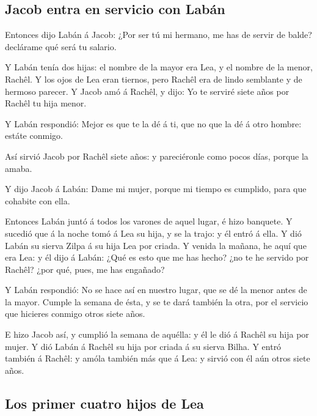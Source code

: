 \hypertarget{jacob-entra-en-servicio-con-labuxe1n}{%
\subsection{Jacob entra en servicio con
Labán}\label{jacob-entra-en-servicio-con-labuxe1n}}

 Entonces dijo Labán á Jacob: ¿Por ser tú mi hermano, me
has de servir de balde? declárame qué será tu salario.

 Y Labán tenía dos hijas: el nombre de la mayor era Lea, y
el nombre de la menor, Rachêl.  Y los ojos de Lea eran
tiernos, pero Rachêl era de lindo semblante y de hermoso parecer.
 Y Jacob amó á Rachêl, y dijo: Yo te serviré siete años por
Rachêl tu hija menor.

 Y Labán respondió: Mejor es que te la dé á ti, que no que
la dé á otro hombre: estáte conmigo.

 Así sirvió Jacob por Rachêl siete años: y pareciéronle
como pocos días, porque la amaba.

 Y dijo Jacob á Labán: Dame mi mujer, porque mi tiempo es
cumplido, para que cohabite con ella.

 Entonces Labán juntó á todos los varones de aquel lugar, é
hizo banquete.  Y sucedió que á la noche tomó á Lea su
hija, y se la trajo: y él entró á ella.  Y dió Labán su
sierva Zilpa á su hija Lea por criada.  Y venida la mañana,
he aquí que era Lea: y él dijo á Labán: ¿Qué es esto que me has hecho?
¿no te he servido por Rachêl? ¿por qué, pues, me has engañado?

 Y Labán respondió: No se hace así en nuestro lugar, que se
dé la menor antes de la mayor.  Cumple la semana de ésta, y
se te dará también la otra, por el servicio que hicieres conmigo otros
siete años.

 E hizo Jacob así, y cumplió la semana de aquélla: y él le
dió á Rachêl su hija por mujer.  Y dió Labán á Rachêl su
hija por criada á su sierva Bilha.  Y entró también á
Rachêl: y amóla también más que á Lea: y sirvió con él aún otros siete
años.

\hypertarget{los-primer-cuatro-hijos-de-lea}{%
\subsection{Los primer cuatro hijos de
Lea}\label{los-primer-cuatro-hijos-de-lea}}

